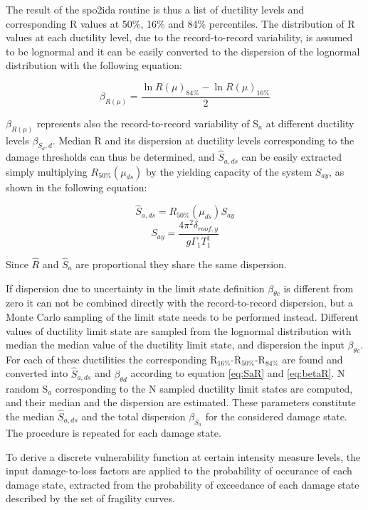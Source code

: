 The result of the spo2ida routine is thus a list of ductility levels and corresponding R values at 50\%, 16\% and 84\% percentiles. The distribution of R values at each ductility level, due to the record-to-record variability, is assumed to be lognormal and it can be easily converted to the dispersion of the lognormal distribution with the following equation:

\begin{equation}
\beta_{R(\mu)} = \frac{\ln R(\mu)_{84\%} - \ln R(\mu)_{16\%}}{2}
\label{eq:betaR}
\end{equation} 

$\beta_{R(\mu)}$ represents also the record-to-record variability of S$_a$ at different ductility levels $\beta_{S_a, d}$. Median R and its dispersion at ductility levels corresponding to the damage thresholds can thus be determined, and $\hat{S}_{a,ds}$ can be easily extracted simply multiplying $R_{50\%}(\mu_{ds})$ by the yielding capacity of the system $S_{ay}$, as shown in the following equation:

\begin{equation}
\hat{S}_{a,ds} = R_{50\%}(\mu_{ds}) S_{ay}
\label{eq:SaR}
\end{equation}
\begin{equation}
S_{ay} = \frac{4 \pi^2 \delta_{roof,y}}{g \Gamma_1 T_1^1}
\end{equation}

Since $\hat{R}$ and $\hat{S}_{a}$ are proportional they share the same dispersion.

If dispersion due to uncertainty in the limit state definition $\beta_{\theta c}$ is different from zero it can not be combined directly with the record-to-record dispersion, but a Monte Carlo sampling of the limit state needs to be performed instead. Different values of ductility limit state are sampled from the  lognormal distribution with median the median value of the ductility limit state, and dispersion the input $\beta_{\theta c}$. For each of these ductilities the corresponding R$_{16\%}$-R$_{50\%}$-R$_{84\%}$ are found and converted into $\hat{S}_{a,ds}$ and $\beta_{\theta d}$ according to equation \ref{eq:SaR} and \ref{eq:betaR}. N random S$_a$ corresponding to the N sampled ductility limit states are computed, and their median and the dispersion are estimated. These parameters constitute the median $\hat{S}_{a,ds}$ and the total dispersion $\beta_{S_a}$ for the considered damage state. The procedure is repeated for each damage state.

To derive a discrete vulnerability function at certain intensity measure levels, the input damage-to-loss factors are applied to the probability of occurance of each damage state, extracted from the probability of exceedance of each damage state described by the set of fragility curves. 

